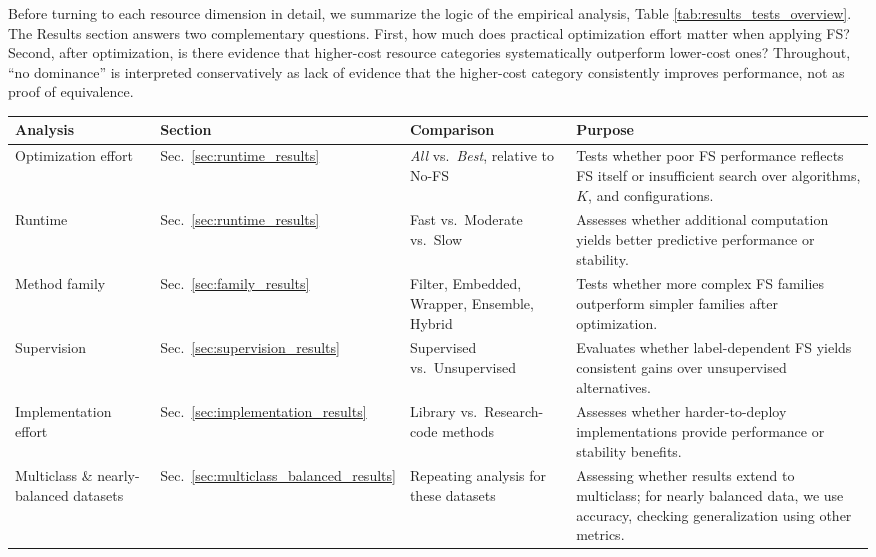 \documentclass[preprint,12pt,authoryear]{elsarticle}
\begin{document}
{Before turning to each resource dimension in detail, we summarize the logic of the empirical analysis, Table \ref{tab:results_tests_overview}. The Results section answers two complementary questions. First, how much does practical optimization effort matter when applying FS? Second, after optimization, is there evidence that higher-cost resource categories systematically outperform lower-cost ones? Throughout, ``no dominance'' is interpreted conservatively as lack of evidence that the higher-cost category consistently improves performance, not as proof of equivalence.

\begin{table}[h!]
\centering
\scriptsize
\setlength{\tabcolsep}{3pt}
\renewcommand{\arraystretch}{1.08}
\begin{tabularx}{\linewidth}{p{2.6cm} p{2.2cm} p{3.8cm} X}
\toprule
\textbf{Analysis} & \textbf{Section} & \textbf{Comparison} & \textbf{Purpose} \\
\midrule

Optimization effort
& Sec.~\ref{sec:runtime_results}
& \emph{All} vs.\ \emph{Best}, relative to No-FS
& Tests whether poor FS performance reflects FS itself or insufficient search over algorithms, $K$, and configurations. \\

Runtime
& Sec.~\ref{sec:runtime_results}
& Fast vs.\ Moderate vs.\ Slow
& Assesses whether additional computation yields better predictive performance or stability. \\

Method family
& Sec.~\ref{sec:family_results}
& Filter, Embedded, Wrapper, Ensemble, Hybrid
& Tests whether more complex FS families outperform simpler families after optimization. \\

Supervision
& Sec.~\ref{sec:supervision_results}
& Supervised vs.\ Unsupervised
& Evaluates whether label-dependent FS yields consistent gains over unsupervised alternatives. \\

Implementation effort
& Sec.~\ref{sec:implementation_results}
& Library vs.\ Research-code methods
& Assesses whether harder-to-deploy implementations provide performance or stability benefits. \\

Multiclass \& nearly-balanced datasets
& Sec.~\ref{sec:multiclass_balanced_results}
& Repeating analysis for these datasets
& Assessing whether results extend to multiclass; for nearly balanced data, we use accuracy, checking generalization using other metrics. \\





\end{tabularx}
\end{table}}
\end{document}
